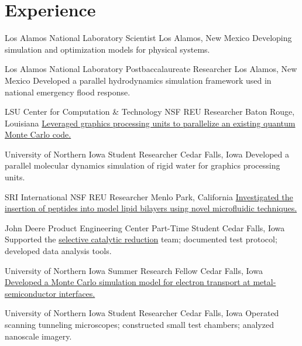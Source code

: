 \section{Experience}
		{Los Alamos National Laboratory}
		{Scientist}
		{Los Alamos, New Mexico}{}
		{Developing simulation and optimization models for physical systems.}

		{Los Alamos National Laboratory}
		{Postbaccalaureate Researcher}
		{Los Alamos, New Mexico}{}
		{Developed a parallel hydrodynamics simulation framework used in national emergency flood response.}

		{LSU Center for Computation \& Technology}
		{NSF REU Researcher}
		{Baton Rouge, Louisiana}{}
		{\href{http://www.institute.loni.org/lasigma/package/vmc/}{Leveraged graphics processing units to parallelize an existing quantum Monte Carlo code.}}

		{University of Northern Iowa}
		{Student Researcher}
		{Cedar Falls, Iowa}{}
		{Developed a parallel molecular dynamics simulation of rigid water for graphics processing units.}

		{SRI International}
		{NSF REU Researcher}
		{Menlo Park, California}{}
		{\href{http://www.sri.com/sites/default/files/brochures/sri-reu-2011.pdf}{Investigated the insertion of peptides into model lipid bilayers using novel microfluidic techniques.}}

		{John Deere Product Engineering Center}
		{Part-Time Student}
		{Cedar Falls, Iowa}{}
		{Supported the \href{https://www.deere.com/en_US/docs/pdfs/emissions/large_engine_technology_final.pdf}{selective catalytic reduction} team; documented test protocol; developed data analysis tools.}

		{University of Northern Iowa}
		{Summer Research Fellow}
		{Cedar Falls, Iowa}{}
		{\href{http://byron.tasseff.com/documents/reports/2010-ballistic_transport_at_metal_semiconductor_interfaces.pdf}{Developed a Monte Carlo simulation model for electron transport at metal-semiconductor interfaces.}}

		{University of Northern Iowa}
		{Student Researcher}
		{Cedar Falls, Iowa}{}
		{Operated scanning tunneling microscopes; constructed small test chambers; analyzed nanoscale imagery.}
